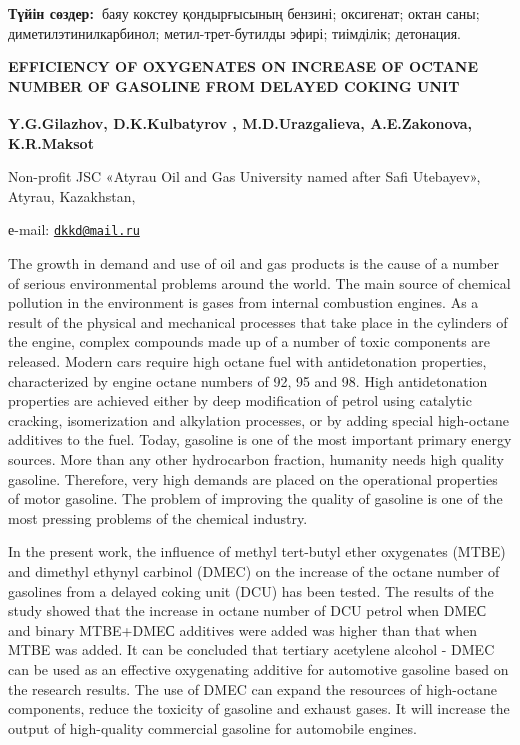 {\bfseries Түйін сөздер:~}баяу кокстеу қондырғысының бензині; оксигенат;
октан саны; диметилэтинилкарбинол; метил-трет-бутилды эфирі; тиімділік;
детонация.

\begin{articleheader}
{\bfseries EFFICIENCY OF OXYGENATES ON INCREASE OF OCTANE NUMBER OF
GASOLINE FROM DELAYED COKING UNIT}

{\bfseries Y.G.Gilazhov, D.K.Kulbatyrov\textsuperscript{\envelope } ,
M.D.Urazgalieva, A.E.Zakonova, K.R.Maksot}
\end{articleheader}

\begin{affiliation}
Non-profit JSC «Atyrau Oil and Gas University named after Safi
Utebayev», Atyrau, Kazakhstan,

е-mail: \href{mailto:dkkd@mail.ru}{\nolinkurl{dkkd@mail.ru}}
\end{affiliation}

The growth in demand and use of oil and gas products is the cause of a
number of serious environmental problems around the world. The main
source of chemical pollution in the environment is gases from internal
combustion engines. As a result of the physical and mechanical processes
that take place in the cylinders of the engine, complex compounds made
up of a number of toxic components are released. Modern cars require
high octane fuel with antidetonation properties, characterized by engine
octane numbers of 92, 95 and 98. High antidetonation properties are
achieved either by deep modification of petrol using catalytic cracking,
isomerization and alkylation processes, or by adding special high-octane
additives to the fuel. Today, gasoline is one of the most important
primary energy sources. More than any other hydrocarbon fraction,
humanity needs high quality gasoline. Therefore, very high demands are
placed on the operational properties of motor gasoline. The problem of
improving the quality of gasoline is one of the most pressing problems
of the chemical industry.

In the present work, the influence of methyl tert-butyl ether oxygenates
(MTBE) and dimethyl ethynyl carbinol (DMEC) on the increase of the
octane number of gasolines from a delayed coking unit (DCU) has been
tested. The results of the study showed that the increase in octane
number of DCU petrol when DMEС and binary MTBE+DMEС additives were added
was higher than that when MTBE was added. It can be concluded that
tertiary acetylene alcohol - DMEC can be used as an effective
oxygenating additive for automotive gasoline based on the research
results. The use of DMEC can expand the resources of high-octane
components, reduce the toxicity of gasoline and exhaust gases. It will
increase the output of high-quality commercial gasoline for automobile
engines.

